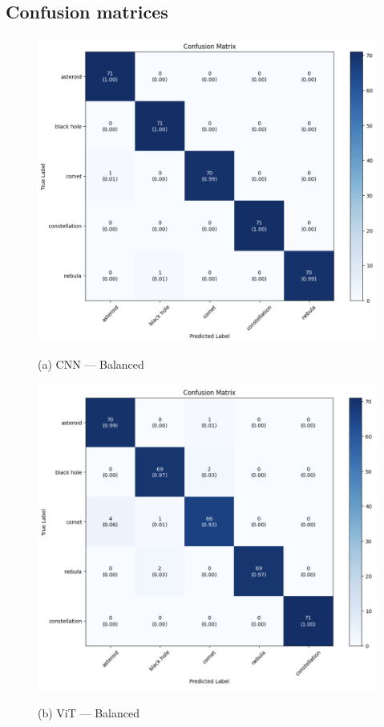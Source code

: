 \subsection{Confusion matrices}
\begin{figure}[!t]
\centering

\begin{minipage}{0.48\textwidth}
  \centering
  \includegraphics[width=\linewidth]{generated/Balance-CNN.png}
  {\footnotesize (a) CNN — Balanced\par}
\end{minipage}\hfill
\begin{minipage}{0.48\textwidth}
  \centering
  \includegraphics[width=\linewidth]{generated/Balance-VIT.png}
  {\footnotesize (b) ViT — Balanced\par}
\end{minipage}


\end{figure}
